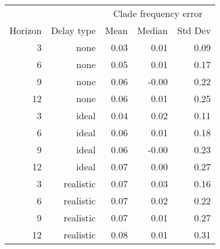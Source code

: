 
\begin{tabular*}{0.7\textwidth}{rrrrr}
\toprule
        &            & \multicolumn{3}{c}{Clade frequency error} \\
Horizon & Delay type & Mean & Median & Std Dev \\
\midrule

3 & none & 0.03 & 0.01 & 0.09 \\
6 & none & 0.05 & 0.01 & 0.17 \\
9 & none & 0.06 & -0.00 & 0.22 \\
12 & none & 0.06 & 0.01 & 0.25 \\
3 & ideal & 0.04 & 0.02 & 0.11 \\
6 & ideal & 0.06 & 0.01 & 0.18 \\
9 & ideal & 0.06 & -0.00 & 0.23 \\
12 & ideal & 0.07 & 0.00 & 0.27 \\
3 & realistic & 0.07 & 0.03 & 0.16 \\
6 & realistic & 0.07 & 0.02 & 0.22 \\
9 & realistic & 0.07 & 0.01 & 0.27 \\
12 & realistic & 0.08 & 0.01 & 0.31 \\

\bottomrule
\end{tabular*}

